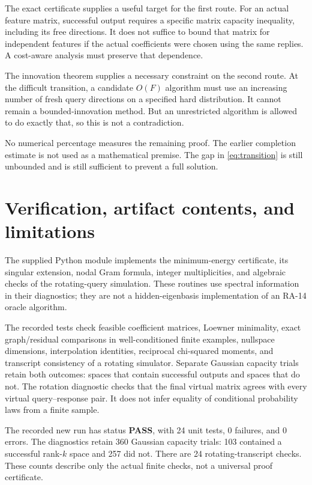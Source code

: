 \documentclass[11pt]{article}
\theoremstyle{definition}
\begin{document}
The exact certificate supplies a useful target for the first route. For an actual feature matrix, successful output requires a specific matrix capacity inequality, including its free directions. It does not suffice to bound that matrix for independent features if the actual coefficients were chosen using the same replies. A cost-aware analysis must preserve that dependence.

The innovation theorem supplies a necessary constraint on the second route. At the difficult transition, a candidate $O(F)$ algorithm must use an increasing number of fresh query directions on a specified hard distribution. It cannot remain a bounded-innovation method. But an unrestricted algorithm is allowed to do exactly that, so this is not a contradiction.

No numerical percentage measures the remaining proof. The earlier completion estimate is not used as a mathematical premise. The gap in \eqref{eq:transition} is still unbounded and is still sufficient to prevent a full solution.

\section{Verification, artifact contents, and limitations}
The supplied Python module implements the minimum-energy certificate, its singular extension, nodal Gram formula, integer multiplicities, and algebraic checks of the rotating-query simulation. These routines use spectral information in their diagnostics; they are not a hidden-eigenbasis implementation of an RA-14 oracle algorithm.

The recorded tests check feasible coefficient matrices, Loewner minimality, exact graph/residual comparisons in well-conditioned finite examples, nullspace dimensions, interpolation identities, reciprocal chi-squared moments, and transcript consistency of a rotating simulator. Separate Gaussian capacity trials retain both outcomes: spaces that contain successful outputs and spaces that do not. The rotation diagnostic checks that the final virtual matrix agrees with every virtual query--response pair. It does not infer equality of conditional probability laws from a finite sample.

The recorded new run has status \textbf{PASS}, with 24 unit tests, 0 failures, and 0 errors. The diagnostics retain 360 Gaussian capacity trials: 103 contained a successful rank-$k$ space and 257 did not. There are 24 rotating-transcript checks. These counts describe only the actual finite checks, not a universal proof certificate.
\end{document}
